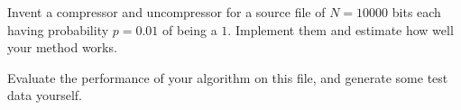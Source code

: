 \documentclass[a4paper,10pt,landscape,twocolumn]{scrartcl}
\begin{document}
\begin{exercise}
Invent a compressor and uncompressor for a source file of $N=10000$
bits each having probability $p=0.01$ of being a $1$. Implement them
and estimate how well your method works.

Evaluate the performance of your algorithm on this file, and generate
some test data yourself.
\end{exercise}
\end{document}
